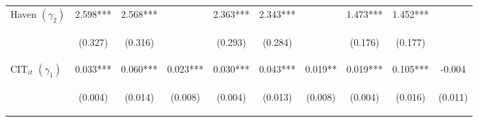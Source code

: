 \begin{center}
\begin{tabular}{lccccccccc}
Haven $(\gamma_2)$ & 2.598*** & 2.568*** &  & 2.363*** & 2.343*** &  & 1.473*** & 1.452*** &  \\
\vspace{4pt} & \begin{footnotesize}(0.327)\end{footnotesize} & \begin{footnotesize}(0.316)\end{footnotesize} & \begin{footnotesize}\end{footnotesize} & \begin{footnotesize}(0.293)\end{footnotesize} & \begin{footnotesize}(0.284)\end{footnotesize} & \begin{footnotesize}\end{footnotesize} & \begin{footnotesize}(0.176)\end{footnotesize} & \begin{footnotesize}(0.177)\end{footnotesize} & \begin{footnotesize}\end{footnotesize} \\
$ \text{CIT}_{it}$ $(\gamma_1)$ & 0.033*** & 0.060*** & 0.023*** & 0.030*** & 0.043*** & 0.019** & 0.019*** & 0.105*** & -0.004 \\
\vspace{4pt} & \begin{footnotesize}(0.004)\end{footnotesize} & \begin{footnotesize}(0.014)\end{footnotesize} & \begin{footnotesize}(0.008)\end{footnotesize} & \begin{footnotesize}(0.004)\end{footnotesize} & \begin{footnotesize}(0.013)\end{footnotesize} & \begin{footnotesize}(0.008)\end{footnotesize} & \begin{footnotesize}(0.004)\end{footnotesize} & \begin{footnotesize}(0.016)\end{footnotesize} & \begin{footnotesize}(0.011)\end{footnotesize} \\

\end{tabular}
\end{center}
